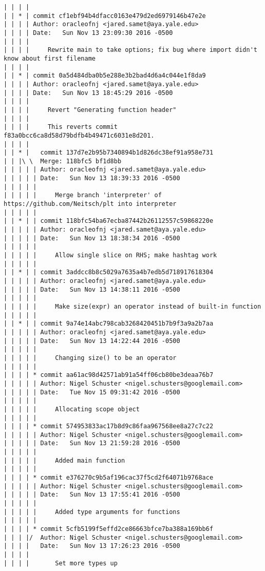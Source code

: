 \begin{lstlisting}
| | | |     
| | * | commit cf1ebf94b4dfacc0163e479d2ed6979146b47e2e
| | | | Author: oracleofnj <jared.samet@aya.yale.edu>
| | | | Date:   Sun Nov 13 23:09:30 2016 -0500
| | | | 
| | | |     Rewrite main to take options; fix bug where import didn't know about first filename
| | | |     
| | * | commit 0a5d484dba0b5e288e3b2bad4d6a4c044e1f8da9
| | | | Author: oracleofnj <jared.samet@aya.yale.edu>
| | | | Date:   Sun Nov 13 18:45:29 2016 -0500
| | | | 
| | | |     Revert "Generating function header"
| | | |     
| | | |     This reverts commit f83a0bcc6ca8d58d79bdfb4b49471c6031e8d201.
| | | |       
| | * |   commit 137d7e2b95b7340894b1d826dc38ef91a958e731
| | |\ \  Merge: 118bfc5 bf1d8bb
| | | | | Author: oracleofnj <jared.samet@aya.yale.edu>
| | | | | Date:   Sun Nov 13 18:39:33 2016 -0500
| | | | | 
| | | | |     Merge branch 'interpreter' of https://github.com/Neitsch/plt into interpreter
| | | | |      
| | * | | commit 118bfc54ba67ecba87442b26112557c59868220e
| | | | | Author: oracleofnj <jared.samet@aya.yale.edu>
| | | | | Date:   Sun Nov 13 18:38:34 2016 -0500
| | | | | 
| | | | |     Allow single slice on RHS; make hashtag work
| | | | |      
| | * | | commit 3addcc8b8c5029a7635a4b7edb5d718917618304
| | | | | Author: oracleofnj <jared.samet@aya.yale.edu>
| | | | | Date:   Sun Nov 13 14:38:11 2016 -0500
| | | | | 
| | | | |     Make size(expr) an operator instead of built-in function
| | | | |      
| | * | | commit 9a74e14abc798cab3268420451b7b9f3a9a2b7aa
| | | | | Author: oracleofnj <jared.samet@aya.yale.edu>
| | | | | Date:   Sun Nov 13 14:22:44 2016 -0500
| | | | | 
| | | | |     Changing size() to be an operator
| | | | |      
| | | | * commit aa61ac98d42571ab91a54ff06cb80be3deaa76b7
| | | | | Author: Nigel Schuster <nigel.schusters@googlemail.com>
| | | | | Date:   Tue Nov 15 09:31:42 2016 -0500
| | | | | 
| | | | |     Allocating scope object
| | | | |      
| | | | * commit 574953833ac17b8d9c86faa967568ee8a27c7c22
| | | | | Author: Nigel Schuster <nigel.schusters@googlemail.com>
| | | | | Date:   Sun Nov 13 21:59:28 2016 -0500
| | | | | 
| | | | |     Added main function
| | | | |      
| | | | * commit e376270c9b5af196cac37f5cd2f64071b9768ace
| | | | | Author: Nigel Schuster <nigel.schusters@googlemail.com>
| | | | | Date:   Sun Nov 13 17:55:41 2016 -0500
| | | | | 
| | | | |     Added type arguments for functions
| | | | |      
| | | | * commit 5cfb5199f5effd2ce86663bfce7ba388a169bb6f
| | | |/  Author: Nigel Schuster <nigel.schusters@googlemail.com>
| | | |   Date:   Sun Nov 13 17:26:23 2016 -0500
| | | |   
| | | |       Set more types up

\end{lstlisting}
